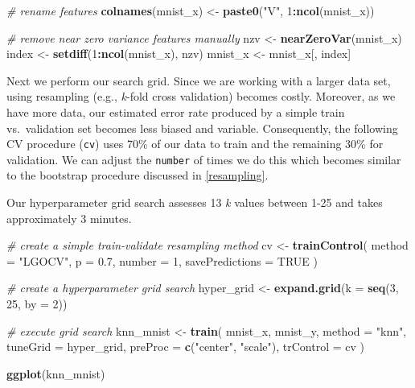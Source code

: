 \documentclass[]{krantz}
\makeatletter
\newenvironment{Shaded}{\begin{snugshade}}{\end{snugshade}}
\newcommand{\CommentTok}[1]{\textcolor[rgb]{0.37,0.37,0.37}{\textit{#1}}}
\newcommand{\DataTypeTok}[1]{\textcolor[rgb]{0.27,0.27,0.27}{#1}}
\newcommand{\DecValTok}[1]{\textcolor[rgb]{0.06,0.06,0.06}{#1}}
\newcommand{\FloatTok}[1]{\textcolor[rgb]{0.06,0.06,0.06}{#1}}
\newcommand{\KeywordTok}[1]{\textcolor[rgb]{0.27,0.27,0.27}{\textbf{#1}}}
\newcommand{\NormalTok}[1]{#1}
\newcommand{\OperatorTok}[1]{\textcolor[rgb]{0.43,0.43,0.43}{\textbf{#1}}}
\newcommand{\OtherTok}[1]{\textcolor[rgb]{0.37,0.37,0.37}{#1}}
\newcommand{\StringTok}[1]{\textcolor[rgb]{0.5,0.5,0.5}{#1}}
\newenvironment{kframe}{%
\medskip{}
\setlength{\fboxsep}{.8em}
 \def\at@end@of@kframe{}%
 \ifinner\ifhmode%
  \def\at@end@of@kframe{\end{minipage}}%
  \begin{minipage}{\columnwidth}%
 \fi\fi%
 \def\FrameCommand##1{\hskip\@totalleftmargin \hskip-\fboxsep
 \colorbox{shadecolor}{##1}\hskip-\fboxsep
     \hskip-\linewidth \hskip-\@totalleftmargin \hskip\columnwidth}%
 \MakeFramed {\advance\hsize-\width
   \@totalleftmargin\z@ \linewidth\hsize
   \@setminipage}}%
 {\par\unskip\endMakeFramed%
 \at@end@of@kframe}
\newenvironment{block}[1]
  {
  \begin{itemize}
  \renewcommand{\labelitemi}{
    \raisebox{-.7\height}[0pt][0pt]{
      {\setkeys{Gin}{width=3em,keepaspectratio}\texttt{[image: icons/\#1]}}
    }
  }
  \setlength{\fboxsep}{1em}
  \begin{kframe}
  \item
  }
  {
  \end{kframe}
  \end{itemize}
  }
\newenvironment{warning}
  {\begin{block}{warning}}
  {\end{block}}
\renewenvironment{Shaded}{\begin{kframe}}{\end{kframe}}
\makeatother
\begin{document}
\begin{Shaded}
\begin{Highlighting}[]
\CommentTok{# rename features}
\KeywordTok{colnames}\NormalTok{(mnist_x) <-}\StringTok{ }\KeywordTok{paste0}\NormalTok{(}\StringTok{"V"}\NormalTok{, }\DecValTok{1}\OperatorTok{:}\KeywordTok{ncol}\NormalTok{(mnist_x))}

\CommentTok{# remove near zero variance features manually}
\NormalTok{nzv <-}\StringTok{ }\KeywordTok{nearZeroVar}\NormalTok{(mnist_x)}
\NormalTok{index <-}\StringTok{ }\KeywordTok{setdiff}\NormalTok{(}\DecValTok{1}\OperatorTok{:}\KeywordTok{ncol}\NormalTok{(mnist_x), nzv)}
\NormalTok{mnist_x <-}\StringTok{ }\NormalTok{mnist_x[, index]}
\end{Highlighting}
\end{Shaded}

Next we perform our search grid. Since we are working with a larger data set, using resampling (e.g., \emph{k}-fold cross validation) becomes costly. Moreover, as we have more data, our estimated error rate produced by a simple train vs.~validation set becomes less biased and variable. Consequently, the following CV procedure (\texttt{cv}) uses 70\% of our data to train and the remaining 30\% for validation. We can adjust the \texttt{number} of times we do this which becomes similar to the bootstrap procedure discussed in \ref{resampling}.

\begin{warning}
Our hyperparameter grid search assesses 13 \emph{k} values between 1-25
and takes approximately 3 minutes.
\end{warning}

\begin{Shaded}
\begin{Highlighting}[]
\CommentTok{# create a simple train-validate resampling method}
\NormalTok{cv <-}\StringTok{ }\KeywordTok{trainControl}\NormalTok{(}
  \DataTypeTok{method =} \StringTok{"LGOCV"}\NormalTok{, }
  \DataTypeTok{p =} \FloatTok{0.7}\NormalTok{,}
  \DataTypeTok{number =} \DecValTok{1}\NormalTok{,}
  \DataTypeTok{savePredictions =} \OtherTok{TRUE}
\NormalTok{  )}

\CommentTok{# create a hyperparameter grid search}
\NormalTok{hyper_grid <-}\StringTok{ }\KeywordTok{expand.grid}\NormalTok{(}\DataTypeTok{k =} \KeywordTok{seq}\NormalTok{(}\DecValTok{3}\NormalTok{, }\DecValTok{25}\NormalTok{, }\DataTypeTok{by =} \DecValTok{2}\NormalTok{))}

\CommentTok{# execute grid search}
\NormalTok{knn_mnist <-}\StringTok{ }\KeywordTok{train}\NormalTok{(}
\NormalTok{  mnist_x,}
\NormalTok{  mnist_y,}
  \DataTypeTok{method =} \StringTok{"knn"}\NormalTok{,}
  \DataTypeTok{tuneGrid =}\NormalTok{ hyper_grid,}
  \DataTypeTok{preProc =} \KeywordTok{c}\NormalTok{(}\StringTok{"center"}\NormalTok{, }\StringTok{"scale"}\NormalTok{),}
  \DataTypeTok{trControl =}\NormalTok{ cv}
\NormalTok{)}

\KeywordTok{ggplot}\NormalTok{(knn_mnist)}
\end{Highlighting}
\end{Shaded}
\end{document}
